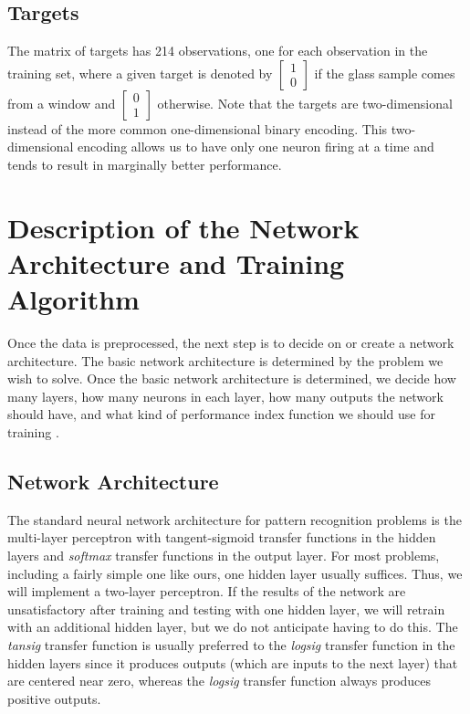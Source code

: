 \documentclass[12pt,halfline,a4paper]{ouparticle}
\begin{document}
\subsection{Targets}
\label{sec3.2}
The matrix of targets has 214 observations, one for each observation in the training set, where a given target is denoted by $\begin{bmatrix} 1 \\ 0 \end{bmatrix}$ if the glass sample comes from a window and $\begin{bmatrix} 0 \\ 1 \end{bmatrix}$ otherwise. Note that the targets are two-dimensional instead of the more common one-dimensional binary encoding. This two-dimensional encoding allows us to have only one neuron firing at a time and tends to result in marginally better performance. 

\section{Description of the Network Architecture and Training Algorithm}
\label{sec4}
Once the data is preprocessed, the next step is to decide on or create a network architecture. The basic network architecture is determined by the problem we wish to solve. Once the basic network architecture is determined, we decide how many layers, how many neurons in each layer, how many outputs the network should have, and what kind of performance index function we should use for training \cite{hagan2014}. 

\subsection{Network Architecture}
\label{sec4.1}
The standard neural network architecture for pattern recognition problems is the multi-layer perceptron with tangent-sigmoid transfer functions in the hidden layers and \emph{softmax} transfer functions in the output layer. For most problems, including a fairly simple one like ours, one hidden layer usually suffices. Thus, we will implement a two-layer perceptron. If the results of the network are unsatisfactory after training and testing with one hidden layer, we will retrain with an additional hidden layer, but we do not anticipate having to do this. The \emph{tansig} transfer function is usually preferred to the \emph{logsig} transfer function in the hidden layers since it produces outputs (which are inputs to the next layer) that are centered near zero, whereas the \emph{logsig} transfer function always produces positive outputs. 
\end{document}
